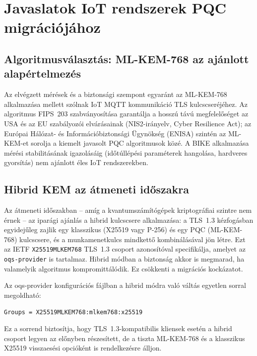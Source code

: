 \section{Javaslatok IoT rendszerek PQC migrációjához}

\subsection{Algoritmusválasztás: ML-KEM-768 az ajánlott alapértelmezés}

Az elvégzett mérések és a biztonsági szempont egyaránt az ML-KEM-768 alkalmazása mellett
szólnak IoT MQTT kommunikáció TLS kulcscseréjéhez. Az algoritmus FIPS~203 szabványosítása
garantálja a hosszú távú megfelelőséget az USA és az EU szabályozói elvárásainak
(NIS2-irányelv, Cyber Resilience Act); az Európai Hálózat- és Információbiztonsági Ügynökség
(ENISA) szintén az ML-KEM-et sorolja a kiemelt javasolt PQC algoritmusok közé. A BIKE
alkalmazása mérési stabilitásának igazolásáig (időtúllépési paraméterek hangolása,
hardveres gyorsítás) nem ajánlott éles IoT rendszerekben.

\subsection{Hibrid KEM az átmeneti időszakra}

Az átmeneti időszakban -- amíg a kvantumszámítógépek kriptográfiai szintre nem érnek --
az iparági ajánlás a hibrid kulcscsere alkalmazása: a TLS~1.3 kézfogásban egyidejűleg
zajlik egy klasszikus (X25519 vagy P-256) és egy PQC (ML-KEM-768) kulcscsere, és a
munkamenetkulcs mindkettő kombinálásával jön létre. Ezt az IETF
\texttt{X25519MLKEM768} TLS~1.3 csoport azonosítóval specifikálja, amelyet az
\texttt{oqs-provider} is tartalmaz. Hibrid módban a biztonság akkor is megmarad, ha
valamelyik algoritmus kompromittálódik. Ez csökkenti a migrációs kockázatot.

Az oqs-provider konfigurációs fájlban a hibrid módra való váltás egyetlen sorral
megoldható:
\begin{verbatim}
Groups = X25519MLKEM768:mlkem768:x25519
\end{verbatim}
Ez a sorrend biztosítja, hogy TLS~1.3-kompatibilis kliensek esetén a hibrid csoport legyen
az előnyben részesített, de a tiszta ML-KEM-768 és a klasszikus X25519 visszaesési opcióként
is rendelkezésre álljon.

